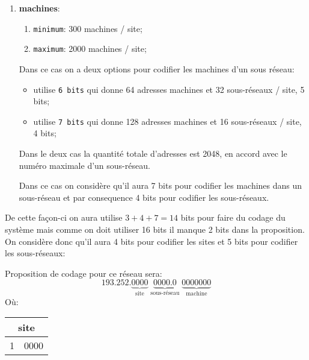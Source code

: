 \documentclass{article}
\begin{document}
\begin{resolution}
\begin{enumerate}[rightmargin=\leftmargin]
        \item \textbf{machines}:
        \begin{enumerate}[noitemsep, rightmargin=\leftmargin]
            \item \texttt{minimum}: 300 machines / site;
            \item \texttt{maximum}: 2000 machines / site;
        \end{enumerate}
        Dans ce cas on a deux options pour codifier les machines d'un sous réseau:
        \begin{itemize}[noitemsep, rightmargin = \leftmargin]
            \item utilise \texttt{6 bits} qui donne 64 adresses machines et 32 sous-réseaux / site, 5 bits;
            \item utilise \texttt{7 bits} qui donne 128 adresses machines et 16 sous-réseaux / site, 4 bits;
        \end{itemize}
        \begin{remark}
            Dans le deux cas la quantité totale d'adresses est 2048, en accord avec le numéro maximale d'un sous-réseau.
        \end{remark}
        Dans ce cas on considère qu'il aura 7 bits pour codifier les machines dans un sous-réseau et par consequence 4 bits pour codifier les sous-réseaux.
    \end{enumerate}
    De cette façon-ci on aura utilise $3+4+7=14$ bits pour faire du codage du système mais comme on doit utiliser 16 bits il manque 2 bits dans la proposition. On considère donc qu'il aura 4 bits pour codifier les sites et 5 bits pour codifier les sous-réseaux:
    \begin{definition}
        Proposition de codage pour ce réseau sera:
        \begin{equation}
            \boxed{
                193.252.\underbrace{0000}_{\text{site}}\;\underbrace{0000.0}_{\text{sous-réseau}}\;\underbrace{0000000}_{\text{machine}}
            }
        \end{equation}
        Où:
        \begin{center}
            \begin{minipage}[t]{0.3\textwidth}
                \begin{table}[H]
                    \centering\begin{tabular}{rl}
                        \multicolumn{2}{c}{\textbf{site}}\\
                        \hline
                        1 & 0000\\

\end{tabular}
\end{table}
\end{minipage}
\end{center}
\end{definition}
\end{resolution}
\end{document}
